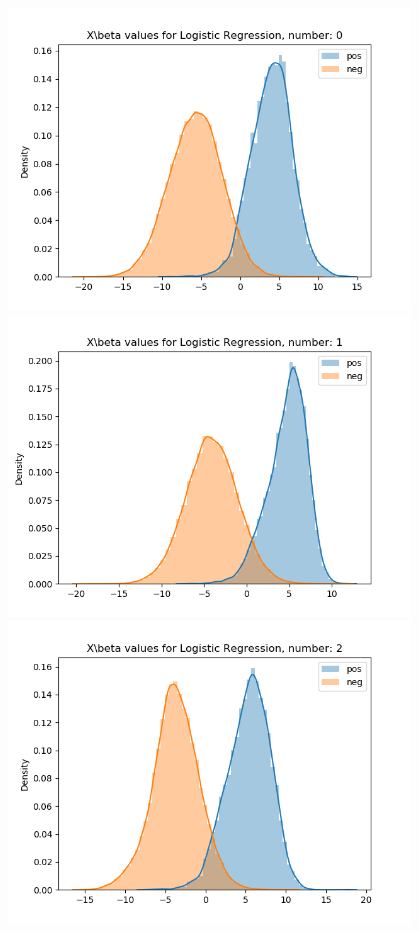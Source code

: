 \documentclass{article}
\begin{document}
\begin{figure}[H]
    \centering
    \begin{minipage}{0.19\textwidth}
        \centering
        \includegraphics[width=0.95\textwidth]{fig/lr/0_weighted.png}
    \end{minipage}
    \begin{minipage}{0.19\textwidth}
        \centering
        \includegraphics[width=0.95\textwidth]{fig/lr/1_weighted.png}
    \end{minipage}
    \begin{minipage}{0.19\textwidth}
        \centering
        \includegraphics[width=0.95\textwidth]{fig/lr/2_weighted.png}

\end{minipage}
\end{figure}
\end{document}

